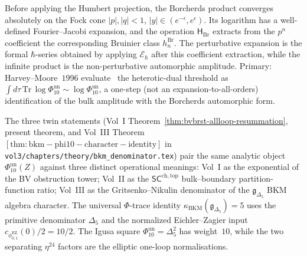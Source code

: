 \begin{remark}
\label{rem:htbb-allloop-exact-vs-pert}
Before applying the Humbert projection, the Borcherds product converges
absolutely on the Fock cone
$|p|, |q|<1$, $|y|\in(e^{-\epsilon}, e^\epsilon)$. Its logarithm has a
well-defined Fourier--Jacobi expansion, and the operation
$\mathsf H_{\mathrm{Br}}$ extracts from the $p^n$ coefficient the
corresponding Bruinier class $h_n^{\mathrm{Br}}$. The perturbative
expansion is
the formal $\hbar$-series obtained by applying \(\mathscr E_\hbar\) after this
coefficient extraction, while the infinite product is the
non-perturbative automorphic amplitude. Primary:
Harvey--Moore~$1996$ evaluate~\cite[\S 5]{HarveyMoore1996} the
heterotic-dual threshold as
$\int d\tau\,\mathrm{Tr}\,\log\Phi_{10}^{\mathrm{un}}\sim\log\Phi_{10}^{\mathrm{un}}$,
a one-step (not an expansion-to-all-orders) identification of the
bulk amplitude with the Borcherds automorphic form.
\end{remark}

\begin{remark}
\label{rem:htbb-allloop-cross-volume}
The three twin statements
(Vol~I Theorem~\ref{thm:bvbrst-allloop-resummation}, present theorem,
and Vol~III Theorem~$\mathrm{[thm:bkm-phi10-character-identity]}$ in
\texttt{vol3/chapters/theory/bkm\_denominator.tex}) pair the same
analytic object $\Phi_{10}^{\mathrm{un}}(Z)$ against three distinct operational
meanings: Vol~I as the exponential of the BV obstruction tower;
Vol~II as the $\mathsf{SC}^{\mathrm{ch,top}}$ bulk--boundary
partition-function ratio; Vol~III as the Gritsenko--Nikulin
denominator of the $\mathfrak{g}_{\Delta_5}$ BKM algebra character.
The universal $\Phi$-trace identity
$\kappa_{\mathrm{BKM}}(\mathfrak{g}_{\Delta_5}) = 5$ uses the primitive
denominator $\Delta_5$ and the normalized Eichler--Zagier input
$c_{\phi_{0,1}^{\mathrm{EZ}}}(0)/2=10/2$. The Igusa square
$\Phi_{10}^{\mathrm{un}}=\Delta_5^2$ has weight~$10$, while the two
separating \(\eta^{24}\) factors are the elliptic one-loop normalisations.
\end{remark}
